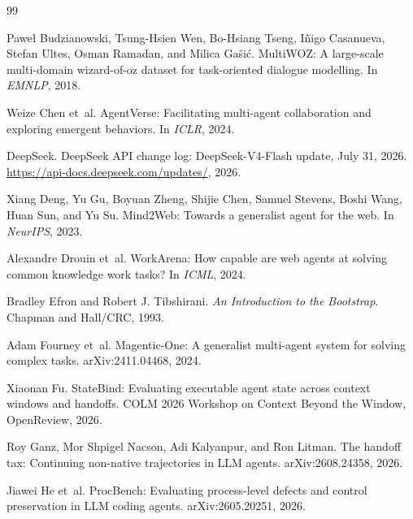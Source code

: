 \documentclass[11pt]{article}
\begin{document}
\clearpage
\begin{thebibliography}{99}

Paweł Budzianowski, Tsung-Hsien Wen, Bo-Hsiang Tseng, Iñigo Casanueva, Stefan Ultes, Osman Ramadan, and Milica Gašić.
\newblock MultiWOZ: A large-scale multi-domain wizard-of-oz dataset for task-oriented dialogue modelling.
\newblock In \emph{EMNLP}, 2018.

Weize Chen et~al.
\newblock AgentVerse: Facilitating multi-agent collaboration and exploring emergent behaviors.
\newblock In \emph{ICLR}, 2024.

DeepSeek.
\newblock DeepSeek API change log: DeepSeek-V4-Flash update, July 31, 2026.
\newblock \url{https://api-docs.deepseek.com/updates/}, 2026.

Xiang Deng, Yu Gu, Boyuan Zheng, Shijie Chen, Samuel Stevens, Boshi Wang, Huan Sun, and Yu Su.
\newblock Mind2Web: Towards a generalist agent for the web.
\newblock In \emph{NeurIPS}, 2023.

Alexandre Drouin et~al.
\newblock WorkArena: How capable are web agents at solving common knowledge work tasks?
\newblock In \emph{ICML}, 2024.

Bradley Efron and Robert J. Tibshirani.
\newblock \emph{An Introduction to the Bootstrap}.
\newblock Chapman and Hall/CRC, 1993.

Adam Fourney et~al.
\newblock Magentic-One: A generalist multi-agent system for solving complex tasks.
\newblock arXiv:2411.04468, 2024.

Xiaonan Fu.
\newblock StateBind: Evaluating executable agent state across context windows and handoffs.
\newblock COLM 2026 Workshop on Context Beyond the Window, OpenReview, 2026.

Roy Ganz, Mor Shpigel Nacson, Adi Kalyanpur, and Ron Litman.
\newblock The handoff tax: Continuing non-native trajectories in LLM agents.
\newblock arXiv:2608.24358, 2026.

Jiawei He et~al.
\newblock ProcBench: Evaluating process-level defects and control preservation in LLM coding agents.
\newblock arXiv:2605.20251, 2026.


\end{thebibliography}
\end{document}
